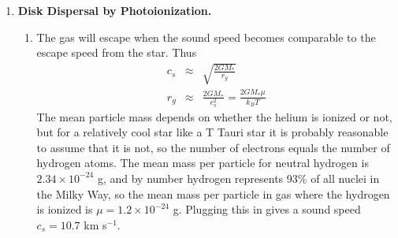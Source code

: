 \begin{enumerate}
\begin{enumerate}
\begin{verbatim}
# Integrate
Mdot2 = 1.0e-4*Msun/yr
lnM2 = np.log(np.logspace(-2, np.log10(50), 500)*Msun)
lnR2 = odeint(dlnRdlnM2, np.log(2.5*Rsun), lnM2,
              args=(3.0, facc, Mdot2))
R2 = np.exp(lnR2[:,0])
M2 = np.exp(lnM2)

# Get luminosity
L2 = facc*G*M*Mdot/R + np.maximum(
    4.0*np.pi*R2**2*sigma*tH**4,
    Lsun*(M2/Msun)**3)

# Plot radius
clf()
p1,=plt.plot(M2/Msun, R2/Rsun, 'b', lw=2)
plt.xlabel(r'$M/M_\odot$')
plt.ylabel(r'$R/R_\odot$')

# Plot luminosity
plt.twinx()
p2,=plt.plot(M2/Msun, L2/Lsun, 'r', lw=2)
plt.ylabel(r'$L/L_\odot$')
plt.yscale('log')
plt.xlim([0,50])
plt.legend([p1,p2], ['Radius', 'Luminosity'], 
           loc='center right')
\end{verbatim}
\begin{marginfigure}
\texttt{[image: hw5sol2]}
\caption[Solution to problem set~\thesolutionset, problem~\theenumi\theenumii]{
\label{fig:hw5sol2}
Radius (blue) and luminosity (red) for the simple protostellar evolution model for a massive star.
}
\end{marginfigure}
The resulting output is shown as Figure \ref{fig:hw5sol2}.

\end{enumerate}

\item {\bf Disk Dispersal by Photoionization.}

\begin{enumerate}

\item The gas will escape when the sound speed becomes comparable to the escape speed from the star. Thus
\begin{eqnarray*}
c_s & \approx & \sqrt{\frac{2 G M_*}{r_g}}\\
r_g & \approx & \frac{2 G M_*}{c_s^2} = \frac{2 G M_* \mu}{k_B T}
\end{eqnarray*}
The mean particle mass depends on whether the helium is ionized or not, but for a relatively cool star like a T Tauri star it is probably reasonable to assume that it is not, so the number of electrons equals the number of hydrogen atoms. The mean mass per particle for neutral hydrogen is $2.34\times 10^{-24}$ g, and by number hydrogen represents 93\% of all nuclei in the Milky Way, so the mean mass per particle in gas where the hydrogen is ionized is $\mu=1.2\times 10^{-24}$ g. Plugging this in gives a sound speed $c_s = 10.7$ km s$^{-1}$.


\end{enumerate}
\end{enumerate}
